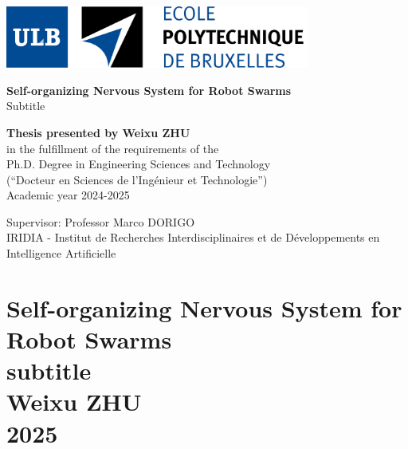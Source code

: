 \documentclass[12pt]{report}
\begin{document}
\setcounter{page}{0}
\thispagestyle{empty}

\noindent
\includegraphics[width=10cm,keepaspectratio]{Logo ULB + EPB fond blanc.png} 

\begin{tcolorbox}[right=4mm]
\color[rgb]{1,1,1}
\Huge{\textbf{Self-organizing Nervous System for Robot Swarms}} \
\\
\Large{Subtitle}
\end{tcolorbox} 

\begin{tcolorbox}[colback=white, halign=left, code={\singlespacing}]
\color{darkblue}
\large{\textbf{Thesis presented by Weixu ZHU}} \\
\color{black}
\large{in the fulfillment of the requirements of the\\ Ph.D. Degree in Engineering Sciences and Technology \\ (``Docteur en Sciences de l’Ingénieur et Technologie'')\\
Academic year 2024-2025}
 
\vspace{2cm}

\begin{flushright}
\color{darkblue} 
Supervisor: Professor Marco DORIGO \\
\color{black}
IRIDIA - Institut de Recherches Interdisciplinaires
et de Développements en Intelligence Artificielle\\
\end{flushright}
\end{tcolorbox}
\vspace{4cm}


\newpage


\chapter*{
\Large  Self-organizing Nervous System for Robot Swarms\\
\normalsize subtitle\\ [8em]
Weixu ZHU\\ 
2025
}

\thispagestyle{empty} %

\mbox{} %
\end{document}
